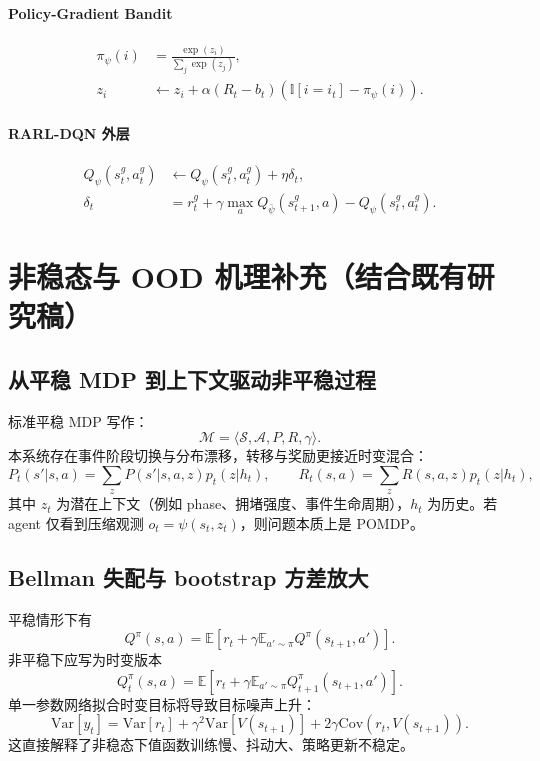 \documentclass[UTF8,11pt,a4paper]{ctexart}
\begin{document}
\paragraph{Policy-Gradient Bandit}
\begin{align}
\pi_\psi(i) &= \frac{\exp(z_i)}{\sum_j \exp(z_j)},\\
z_i &\leftarrow z_i + \alpha (R_t-b_t)\left(\mathbb{I}[i=i_t]-\pi_\psi(i)\right).
\end{align}
\paragraph{RARL-DQN 外层}
\begin{align}
Q_\psi(s_t^g,a_t^g) &\leftarrow Q_\psi(s_t^g,a_t^g) + \eta \delta_t,\\
\delta_t &= r_t^g + \gamma\max_a Q_{\bar\psi}(s_{t+1}^g,a)-Q_\psi(s_t^g,a_t^g).
\end{align}

\section{非稳态与 OOD 机理补充（结合既有研究稿）}
\subsection{从平稳 MDP 到上下文驱动非平稳过程}
标准平稳 MDP 写作：
\begin{equation}
\mathcal{M}=\langle \mathcal{S},\mathcal{A},P,R,\gamma\rangle.
\end{equation}
本系统存在事件阶段切换与分布漂移，转移与奖励更接近时变混合：
\begin{equation}
P_t(s'|s,a)=\sum_z P(s'|s,a,z)p_t(z|h_t),\qquad
R_t(s,a)=\sum_z R(s,a,z)p_t(z|h_t),
\end{equation}
其中 \(z_t\) 为潜在上下文（例如 phase、拥堵强度、事件生命周期），\(h_t\) 为历史。若 agent 仅看到压缩观测 \(o_t=\psi(s_t,z_t)\)，则问题本质上是 POMDP。

\subsection{Bellman 失配与 bootstrap 方差放大}
平稳情形下有
\begin{equation}
Q^\pi(s,a)=\mathbb{E}[r_t+\gamma \mathbb{E}_{a'\sim\pi}Q^\pi(s_{t+1},a')].
\end{equation}
非平稳下应写为时变版本
\begin{equation}
Q_t^\pi(s,a)=\mathbb{E}[r_t+\gamma \mathbb{E}_{a'\sim\pi}Q_{t+1}^\pi(s_{t+1},a')].
\end{equation}
单一参数网络拟合时变目标将导致目标噪声上升：
\begin{equation}
\mathrm{Var}[y_t]
=\mathrm{Var}[r_t]+\gamma^2\mathrm{Var}[V(s_{t+1})]+2\gamma\mathrm{Cov}(r_t,V(s_{t+1})).
\end{equation}
这直接解释了非稳态下值函数训练慢、抖动大、策略更新不稳定。
\end{document}
